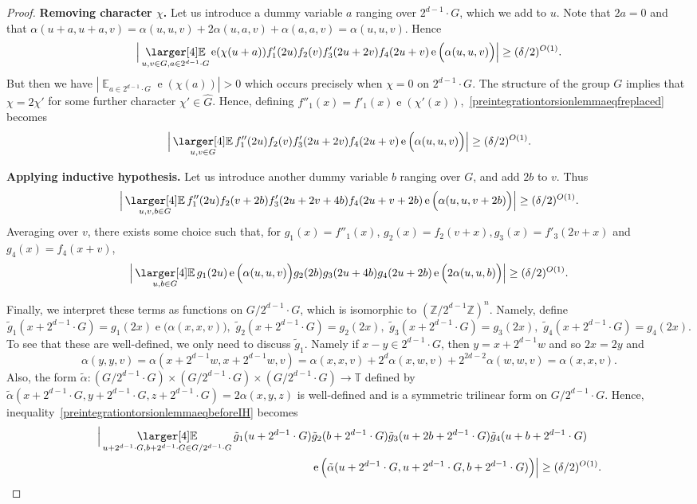 \documentclass[a4paper,11pt]{article}
\numberwithin{theorem}{section}
\theoremstyle{definition}
\newcommand{\on}[1]{
	\operatorname{#1}
}
\newcommand\ex{\mathop{\mathbb{E}}}
\newcommand{\exx}{
  \mathop{
    \mathchoice{\vcenter{\hbox{\larger[4]$\mathbb{E}$}}}
               {\kern0pt\mathbb{E}}
               {\kern0pt\mathbb{E}}
               {\kern0pt\mathbb{E}}
  }\displaylimits
}
\begin{document}
\begin{proof}
    \noindent\textbf{Removing character $\chi$.} Let us introduce a dummy variable $a$ ranging over $2^{d-1}\cdot G$, which we add to $u$. Note that $2a =0$ and that $\alpha(u + a,u + a, v) = \alpha(u,u,v) + 2\alpha(u,a,v) + \alpha(a,a,v) = \alpha(u,u,v)$. Hence
     \[\Big|\exx_{u , v \in G, a\in 2^{d-1}\cdot G} \on{e}(\chi(u + a))f'_1(2u) f_2(v) f'_3(2u + 2v) f_4(2u + v) \on{e}\Big(\alpha(u,u, v)\Big)\Big| \geq (\delta/2)^{O(1)}.\]
     But then we have $|\ex_{a\in 2^{d-1}\cdot G} \on{e}(\chi(a))| > 0$ which occurs precisely when $\chi = 0$ on $2^{d-1}\cdot G$. The structure of the group $G$ implies that $\chi = 2\chi'$ for some further character $\chi' \in \hat{G}$. Hence, defining $f''_1(x) = f'_1(x) \on{e}(\chi'(x))$,~\eqref{preintegrationtorsionlemmaeqfreplaced} becomes
     \[\Big|\exx_{u , v \in G} f''_1(2u) f_2(v) f'_3(2u + 2v) f_4(2u + v) \on{e}\Big(\alpha(u,u, v)\Big)\Big| \geq (\delta/2)^{O(1)}.\]

     \noindent\textbf{Applying inductive hypothesis.} Let us introduce another dummy variable $b$ ranging over $G$, and add $2b$ to $v$. Thus
     \[\Big|\exx_{u , v , b\in G} f''_1(2u) f_2(v + 2b) f'_3(2u + 2v + 4b) f_4(2u + v + 2b) \on{e}\Big(\alpha(u,u, v + 2b)\Big)\Big| \geq (\delta/2)^{O(1)}.\]
     Averaging over $v$, there exists some choice such that, for $g_1(x) = f''_1(x)$, $g_2(x) = f_2(v + x), g_3(x) = f'_3(2v + x)$ and $g_4(x) = f_4(x + v)$,
     \begin{equation}\label{preintegrationtorsionlemmaeqbeforeIH}\Big|\exx_{u, b\in G} g_1(2u) \on{e}\Big(\alpha(u,u, v)\Big) g_2(2b) g_3(2u + 4b) g_4(2u + 2b) \on{e}\Big(2\alpha(u,u, b)\Big)\Big| \geq (\delta/2)^{O(1)}.\end{equation}

     Finally, we interpret these terms as functions on $G/2^{d-1} \cdot G$, which is isomorphic to $(\mathbb{Z}/2^{d-1}\mathbb{Z})^n$. Namely, define 
     \[\tilde{g}_1(x + 2^{d-1}\cdot G) = g_1(2x) \on{e}\Big(\alpha(x,x, v)\Big),\,\,\tilde{g}_2(x + 2^{d-1}\cdot G) = g_2(2x),\,\,\tilde{g}_3(x + 2^{d-1}\cdot G) = g_3(2x),\,\,\tilde{g}_4(x + 2^{d-1}\cdot G) = g_4(2x).\]
     To see that these are well-defined, we only need to discuss $\tilde{g}_1$. Namely if $x - y \in  2^{d-1}\cdot G$, then $y = x + 2^{d-1}w$ and so $2x = 2y$ and
     \[\alpha(y,y, v) = \alpha(x + 2^{d-1}w,x + 2^{d-1}w, v) = \alpha(x,x,v) + 2^{d}\alpha(x, w, v) + 2^{2d-2}\alpha(w,w,v) = \alpha(x,x,v).\]
     Also, the form $\tilde{\alpha} : (G/2^{d-1} \cdot G) \times (G/2^{d-1} \cdot G) \times (G/2^{d-1} \cdot G) \to \mathbb{T}$ defined by $\tilde{\alpha}(x + 2^{d-1}\cdot G,y + 2^{d-1}\cdot G,z + 2^{d-1}\cdot G) = 2\alpha(x,y,z)$ is well-defined and is a symmetric trilinear form on $G/2^{d-1} \cdot G$. Hence, inequality~\eqref{preintegrationtorsionlemmaeqbeforeIH} becomes
     \begin{align*}\Big|\exx_{u + 2^{d-1} \cdot G, b + 2^{d-1} \cdot G\in G/2^{d-1} \cdot G} \tilde{g}_1(u + 2^{d-1} \cdot G) &\tilde{g}_2(b + 2^{d-1} \cdot G) \tilde{g}_3(u + 2b + 2^{d-1} \cdot G) \tilde{g}_4(u + b + 2^{d-1} \cdot G) \\
     &\on{e}\Big(\tilde{\alpha}(u + 2^{d-1} \cdot G,u + 2^{d-1} \cdot G, b + 2^{d-1} \cdot G)\Big)\Big| \geq (\delta/2)^{O(1)}.\end{align*}


\end{proof}
\end{document}
